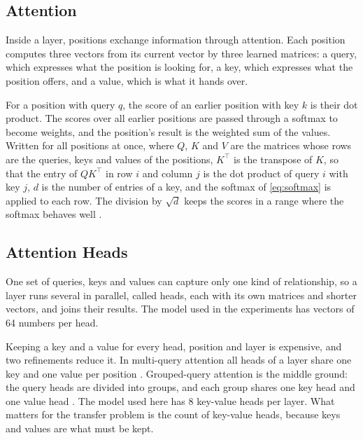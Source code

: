 \subsection{Attention}

Inside a layer, positions exchange information through attention. Each position computes three vectors from its current vector by three learned
matrices: a query, which expresses what the position is looking for, a key,
which expresses what the position offers, and a value, which is what it hands
over.

For a position with query $q$, the score of an earlier position with key $k$
is their dot product. The scores over all earlier positions are passed
through a softmax to become weights, and the position's result is the
weighted sum of the values. Written for all positions at once,
where $Q$, $K$ and $V$ are the matrices whose rows are the queries, keys and
values of the positions, $K^{\top}$ is the transpose of $K$, so that the
entry of $Q K^{\top}$ in row $i$ and column $j$ is the dot product of query
$i$ with key $j$, $d$ is the number of entries of a key, and the softmax of
\cref{eq:softmax} is applied to each row. The division by $\sqrt{d}$ keeps
the scores in a range where the softmax behaves well \citep{vaswani2017}.

\subsection{Attention Heads}

One set of queries, keys and values can capture only one kind of relationship, so a
layer runs several in parallel, called heads, each with its own matrices and
shorter vectors, and joins their results. The model used in the experiments has vectors of 64 numbers per head.

Keeping a key and a value for every head, position and layer is expensive, and
two refinements reduce it. In multi-query attention all heads of a layer share
one key and one value per position \citep{shazeer2019mqa}. Grouped-query
attention is the middle ground: the query heads are divided into groups, and
each group shares one key head and one value head \citep{ainslie2023gqa}. The
model used here has 8 key-value heads per layer. What matters for the transfer problem is the count of key-value heads, because keys and values are what must be
kept.

